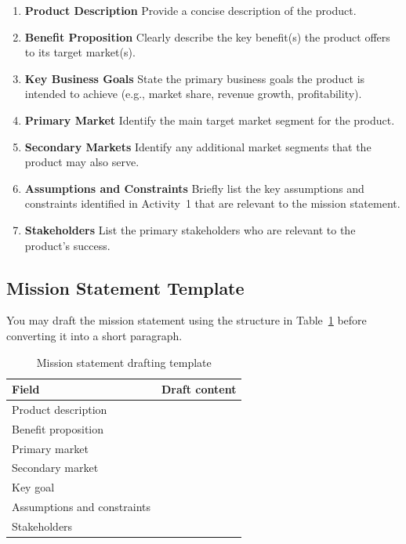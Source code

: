 \begin{enumerate}

\item \textbf{Product Description}  
Provide a concise description of the product.

\item \textbf{Benefit Proposition}  
Clearly describe the key benefit(s) the product offers to its target market(s).

\item \textbf{Key Business Goals}  
State the primary business goals the product is intended to achieve (e.g., market share, revenue growth, profitability).

\item \textbf{Primary Market}  
Identify the main target market segment for the product.

\item \textbf{Secondary Markets}  
Identify any additional market segments that the product may also serve.

\item \textbf{Assumptions and Constraints}  
Briefly list the key assumptions and constraints identified in Activity~1 that are relevant to the mission statement.

\item \textbf{Stakeholders}  
List the primary stakeholders who are relevant to the product’s success.

\end{enumerate}




\subsection{Mission Statement Template}

You may draft the mission statement using the structure in Table~\ref{tab:session56-mission-template} before converting it into a short paragraph.

\begin{table}[htbp]
\centering
\caption{Mission statement drafting template}
\label{tab:session56-mission-template}
\renewcommand{\arraystretch}{1.2}
\begin{tabularx}{\textwidth}{|>{\raggedright\arraybackslash}p{}|X|}
\hline
\textbf{Field} & \textbf{Draft content} \\
\hline
Product description &  \\
\hline
Benefit proposition &  \\
\hline
Primary market &  \\
\hline
Secondary market &  \\
\hline
Key goal &  \\
\hline
Assumptions and constraints &  \\
\hline
Stakeholders &  \\
\hline
\end{tabularx}
\end{table}

